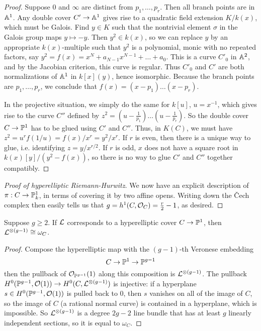 \documentclass[11pt]{amsart}
\begin{document}
\begin{proof}
Suppose 0 and $\infty$ are distinct from $p_1,\dots,p_r$. Then all branch points are in $\AA^1$. Any double cover $C'\to \AA^1$ gives rise to a quadratic field extension $K/k(x)$, which must be Galois. Find $y\in K$ such that the nontrivial element $\sigma$ in the Galois group maps $y \mapsto -y$. Then $y^2\in k(x)$, so we can replace $y$ by an appropriate $k(x)$-multiple such that $y^2$ is a polynomial, monic with no repeated factors, say $y^2 = f(x) = x^N + a_{N-1}x^{N-1} + \dots + a_0$. This is a curve $C'_0$ in $\AA^2$, and by the Jacobian criterion, this curve is regular. Thus $C'_0$ and $C'$ are both normalizations of $\AA^1$ in $k[x](y)$, hence isomorphic. Because the branch points are $p_1,\dots,p_r$, we conclude that $f(x) = (x-p_1)\dots(x-p_r)$.

In the projective situation, we simply do the same for $k[u]$, $u = x^{-1}$, which gives rise to the curve $C''$ defined by $z^2 = (u-\frac{1}{p_1})\dots(u - \frac{1}{p_r})$. So the double cover $C\to \PP^1$ has to be glued using $C'$ and $C''$. Thus, in $K(C)$, we must have $z^2 = u^rf(1/u) = f(x)/x^r = y^2/x^r$. If $r$ is even, then there is a unique way to glue, i.e. identifying $z = y/x^{r/2}$. If $r$ is odd, $x$ does not have a square root in $k(x)[y]/(y^2 - f(x))$, so there is no way to glue $C'$ and $C''$ together compatibly.
\end{proof}


\begin{proof}[Proof of hyperelliptic Riemann-Hurwitz]
We now have an explicit description of $\pi: C\to \PP^1_k$, in terms of covering it by two affine opens. Writing down the \v{C}ech complex then easily tells us that $g = h^1(C, \cO_C) = \frac{r}{2}-1$, as desired.
\end{proof}


\begin{prop}
Suppose $g\ge 2$. If $\cL$ corresponds to a hyperelliptic cover $C\to \PP^1$, then $\cL^{\otimes (g-1)} \cong \omega_C$.
\end{prop}

\begin{proof}
Compose the hyperelliptic map with the $(g-1)$-th Veronese embedding
\[C\to \PP^1 \to \PP^{g-1}\]
then the pullback of $\cO_{\PP^{g-1}}(1)$ along this composition is $\cL^{\otimes (g-1)}$. The pullback $H^0(\PP^{g-1}, \cO(1)) \to H^0(C, \cL^{\otimes (g-1)})$ is injective: if a hyperplane $s\in H^0(\PP^{g-1}, \cO(1))$ is pulled back to 0, then $s$ vanishes on all of the image of $C$, so the image of $C$ (a rational normal curve) is contained in a hyperplane, which is impossible. So $\cL^{\otimes (g-1)}$ is a degree $2g-2$ line bundle that has at least $g$ linearly independent sections, so it is equal to $\omega_C$.
\end{proof}
\end{document}
